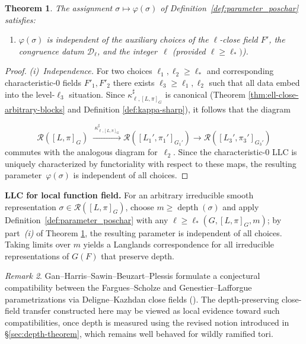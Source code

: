\documentclass[american]{article}
\numberwithin{equation}{section}
\numberwithin{figure}{section}
\theoremstyle{plain}
\newtheorem{theorem}{Theorem}[section]
\theoremstyle{definition}
\theoremstyle{remark}
\newtheorem{remark}[theorem]{Remark}
\DeclareMathOperator{\depth}{depth}
\begin{document}
\begin{theorem}\label{thm:LLC_poschar}
The assignment \(\sigma\longmapsto\varphi(\sigma)\) of
Definition~\ref{def:parameter_poschar} satisfies:

\begin{enumerate}
  \item 
        \(\varphi(\sigma)\) is independent of the auxiliary choices
        of the \(\ell\)-close field \(F'\), the congruence datum
        \(\mathcal D_{\ell}\), and the integer~\(\ell\)
        (provided \(\ell\ge \ell_*)\)).
\end{enumerate}
\end{theorem}

\begin{proof}

\noindent
\textit{(i)~Independence.}
For two choices \(\ell_1,\ell_2\ge\ell_*\) and corresponding
characteristic-\(0\) fields \(F'_1,F'_2\)
there exists \(\ell_3\ge\ell_1,\ell_2\) such that all data embed into the
level-$\ell_3$ situation. Since $\kappa_{\ell,[L,\pi]_G}^{\sharp}$ is canonical 
(Theorem \ref{thm:ell-close-arbitrary-blocks} and Definition \ref{def:kappa-sharp}), 
it follows that the diagram

\[
  \mathcal R([L,\pi]_{G})\;
  \xrightarrow{\;\kappa_{\ell,[L,\pi]_G}^{\sharp}\;}
  \mathcal R([L_1',\pi_1']_{G_1'})
  \longrightarrow
  \mathcal R([L_3',\pi_3']_{G_3'})
\]
commutes with the analogous diagram for~\(\ell_2\).
Since the characteristic-\(0\) LLC is uniquely characterized
by functoriality with respect to these maps, the resulting
parameter~\(\varphi(\sigma)\) is independent of all choices.

\smallskip
\noindent

\end{proof}

\medskip
\noindent\textbf{LLC for local function field.}
For an arbitrary irreducible smooth representation \(\sigma\in \mathcal R([L,\pi]_G)\),
choose \(m\ge\depth(\sigma)\) and apply
Definition~\ref{def:parameter_poschar} with any
\(\ell\ge\ell_*(G,[L,\pi]_G,m)\); by part~\textit{(i)} of Theorem \ref{thm:LLC_poschar},
the resulting parameter is independent of all choices.
Taking limits over \(m\) yields a
Langlands correspondence for all irreducible representations of
\(G(F)\) that preserve depth.
\smallskip
\begin{remark}
Gan--Harris--Sawin--Beuzart--Plessis \cite{GHSBP}
formulate a conjectural compatibility between the Fargues--Scholze and
Genestier--Lafforgue parametrizations via Deligne--Kazhdan close fields
(\cite[Conjecture~11.7]{GHSBP}).
The depth-preserving close-field transfer constructed here may be viewed as
local evidence toward such compatibilities, once depth is measured using the
revised notion introduced in \S \ref{sec:depth-theorem}, which remains well behaved for wildly
ramified tori.
\end{remark}
\end{document}
